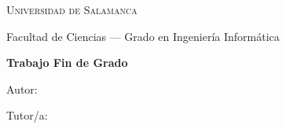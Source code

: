 \thispagestyle{empty}
\begin{titlepage}
\centering
\vspace*{1cm}
{\Large\textsc{Universidad de Salamanca}\par}
\vspace{0.3cm}
{\large Facultad de Ciencias --- Grado en Ingeniería Informática\par}
\vfill
{\huge\bfseries Trabajo Fin de Grado\par}
\vspace{0.6cm}
{\LARGE\itshape \TFGTitulo\par}
\vspace{0.3cm}
{\large \TFGSubtitulo\par}
\vfill
{\large Autor: \TFGAutor\par}
{\large Tutor/a: \TFGTutor\par}
\vfill
{\large \TFGAnio\par}
\end{titlepage}
